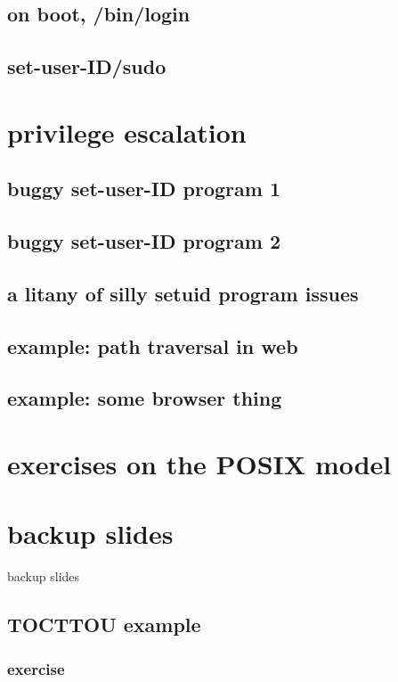 \subsection{on boot, /bin/login}


\subsection{set-user-ID/sudo}


\section{privilege escalation}


\subsection{buggy set-user-ID program 1}


\subsection{buggy set-user-ID program 2}


\subsection{a litany of silly setuid program issues}


\subsection{example: path traversal in web}

\subsection{example: some browser thing}


\section{exercises on the POSIX model}


\section{backup slides}
\begin{frame}{backup slides}
\end{frame}

\subsection{TOCTTOU example}




\subsubsection{exercise}





